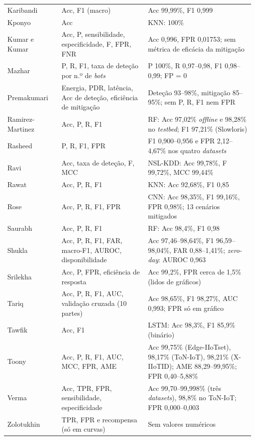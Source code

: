 \documentclass[conference,a4paper]{IEEEtran}
\begin{document}
\begin{table}[p]
\begin{tabular}{@{}>{\raggedright\arraybackslash}p{}>{\raggedright\arraybackslash}p{}>{\raggedright\arraybackslash}p{}@{}}
Karibandi~\cite{karibandi2025cyberdome} & Acc, F1 (macro) & Acc 99,99\%, F1 0,999 \\
Kponyo~\cite{kponyo2020lightweight} & Acc & KNN: 100\% \\
Kumar e Kumar~\cite{kumar2025advanced} & Acc, P, sensibilidade, especificidade, F, FPR, FNR & Acc 0,996, FPR 0,01753; sem métrica de eficácia da mitigação \\
Mazhar~\cite{mazhar2022ridps} & P, R, F1, taxa de deteção por n.º de \textit{bots} & P 100\%, R 0,97--0,98, F1 0,98--0,99; FP = 0 \\
Premakumari~\cite{premakumari2025qlearning} & Energia, PDR, latência, Acc de deteção, eficiência de mitigação & Deteção 93--98\%, mitigação 85--95\%; sem P, R, F1 nem FPR \\
Ramirez-Martinez~\cite{ramirezmartinez2025p4} & Acc, P, R, F1 & RF: Acc 97,02\% \textit{offline} e 98,28\% no \textit{testbed}; F1 97,21\% (Slowloris) \\
Rasheed~\cite{Rasheed2026} & P, R, F1, FPR & F1 0,900--0,956 e FPR 2,12--4,67\% nos quatro \textit{datasets} \\
Ravi~\cite{ravi2020semisupervised} & Acc, taxa de deteção, F, MCC & NSL-KDD: Acc 99,78\%, F 99,72\%, MCC 99,44\% \\
Rawat~\cite{rawat2024intelligent} & Acc, P, R, F1 & KNN: Acc 92,68\%, F1 0,85 \\
Rose~\cite{rose2022ideres} & Acc, P, R, F1, FPR & CNN: Acc 98,35\%, F1 99,16\%, FPR 0,98\%; 13 cenários mitigados \\
Saurabh~\cite{saurabh2022mlaps} & Acc, P, R, F1 & RF: Acc 98,4\%, F1 0,98 \\
Shukla~\cite{shukla2026cyber} & Acc, P, R, F1, FAR, macro-F1, AUROC, disponibilidade & Acc 97,46--98,64\%, F1 96,59--98,04\%, FAR 0,88--1,41\%; \textit{zero-day}: AUROC 0,963 \\
Srilekha~\cite{srilekha2025hybrid} & Acc, P, FPR, eficiência de resposta & Acc 99,2\%, FPR cerca de 1,5\% (lidos de gráficos) \\
Tariq~\cite{tariq2025saegru} & Acc, P, R, F1, AUC, validação cruzada (10 partes) & Acc 98,65\%, F1 98,27\%, AUC 0,993; FPR só em gráfico \\
Tawfik~\cite{tawfik2021internet} & Acc, F1 & LSTM: Acc 98,3\%, F1 85,9\% (binário) \\
Toony~\cite{toony2024multiblock} & Acc, P, R, F1, AUC, MCC, FPR, AME & Acc 99,75\% (Edge-IIoTset), 98,17\% (ToN-IoT), 98,21\% (X-IIoTID); AME 88,29--99,95\%; FPR 0,40--5,88\% \\
Verma~\cite{verma2024petrak} & Acc, TPR, FPR, sensibilidade, especificidade & Acc 99,70--99,998\% (três \textit{datasets}), 98,8\% no ToN-IoT; FPR 0,000--0,003 \\
Zolotukhin~\cite{zolotukhin2021curious} & TPR, FPR e recompensa (só em curvas) & Sem valores numéricos \\
\bottomrule
\end{tabular}


\end{table}
\end{document}
